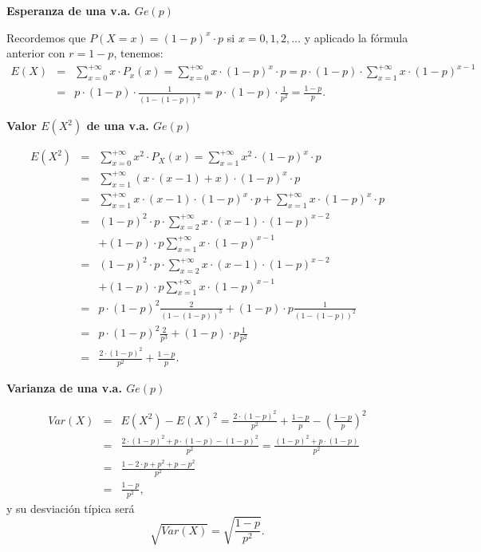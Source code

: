 \documentclass[]{book}
\begin{document}
\textbf{Esperanza de una v.a. \(Ge(p)\)}

Recordemos que \(P(X=x)=(1-p)^x\cdot p\) si \(x=0,1,2,\ldots\) y aplicado la fórmula anterior con \(r=1-p\), tenemos:
\begin{eqnarray*}
E(X)&=&\sum_{x=0}^{+\infty} x\cdot P_x(x)=\sum_{x=0}^{+\infty} x\cdot (1-p)^x\cdot p=
p\cdot (1-p) \cdot \sum_{x=1}^{+\infty} x\cdot (1-p)^{x-1}\\
&=& p\cdot (1-p)\cdot \frac{1}{(1-(1-p))^2}=p\cdot (1-p)\cdot \frac{1}{p^2}=\frac{1-p}{p}.
\end{eqnarray*}

\textbf{Valor \(E(X^2)\) de una v.a. \(Ge(p)\)}

\begin{eqnarray*}
E(X^2)&=&\sum_{x=0}^{+\infty} x^2\cdot P_X(x)=\sum_{x=1}^{+\infty} x^2\cdot (1-p)^x\cdot p\\
&=& 
\sum_{x=1}^{+\infty} (x\cdot (x-1)+x)\cdot (1-p)^{x}\cdot p\\
&=&
\sum_{x=1}^{+\infty} x\cdot (x-1)\cdot (1-p)^{x}\cdot p+\sum_{x=1}^{+\infty} x \cdot (1-p)^{x}\cdot p\\
&=&
(1-p)^{2}\cdot p\cdot \sum_{x=2}^{+\infty} x\cdot (x-1)\cdot (1-p)^{x-2}\\ 
& & +    (1-p)\cdot p\sum_{x=1}^{+\infty} x \cdot (1-p)^{x-1} 
\\  &=&
(1-p)^{2}\cdot p\cdot \sum_{x=2}^{+\infty} x\cdot (x-1)\cdot (1-p)^{x-2}\\ 
& &+   (1-p)\cdot p\sum_{x=1}^{+\infty} x \cdot (1-p)^{x-1}\\
&=&
p\cdot (1-p)^2 \frac{2}{(1-(1-p))^3}+  (1-p)\cdot p \frac{1}{(1-(1-p))^2}\\
&=&
p\cdot (1-p)^2 \frac{2}{p^3}+  (1-p)\cdot p \frac{1}{p^2}\\
&=&\frac{2\cdot (1-p)^2}{p^2}+\frac{1-p}{p}.
\end{eqnarray*}

\textbf{Varianza de una v.a. \(Ge(p)\)}

\begin{eqnarray*}
Var(X)&=&E(X^2)-E(X)^2=\frac{2\cdot (1-p)^2}{p^2}+\frac{1-p}{p}-\left(\frac{1-p}{p}\right)^2\\
&=&
\frac{2\cdot (1-p)^2+p\cdot(1-p)-(1-p)^2}{p^2}=\frac{(1-p)^2+p\cdot(1-p)}{p^2}\\
&=&
\frac{1-2\cdot p + p^2+p-p^2}{p^2}\\
&=& \frac{1-p}{p^2},
\end{eqnarray*}
y su desviación típica será
\[\sqrt{Var(X)}=\sqrt{\frac{1-p}{p^2}}.\]
\end{document}
